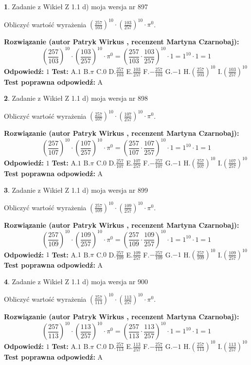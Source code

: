 \documentclass[12pt, a4paper]{article}
\theoremstyle{definition} %
\newtheorem{zad}{}
\newcommand{\zadStart}[1]{\begin{zad}#1\newline}
\newcommand{\zadStop}{\end{zad}}
\newcommand{\rozwStart}[2]{\noindent \textbf{Rozwiązanie (autor #1 , recenzent #2): }\newline}
\newcommand{\rozwStop}{\newline}
\newcommand{\odpStart}{\noindent \textbf{Odpowiedź:}\newline}
\newcommand{\odpStop}{\newline}
\newcommand{\testStart}{\noindent \textbf{Test:}\newline}
\newcommand{\testStop}{\newline}
\newcommand{\kluczStart}{\noindent \textbf{Test poprawna odpowiedź:}\newline}
\newcommand{\kluczStop}{\newline}
\begin{document}
\zadStart{Zadanie z Wikieł Z 1.1 d) moja wersja nr 897}

Obliczyć wartość wyrażenia $(\frac{257}{103})^{10} \cdot (\frac{103}{257})^{10} \cdot \pi^{0}$.
\zadStop
\rozwStart{Patryk Wirkus}{Martyna Czarnobaj}
$$(\frac{257}{103})^{10} \cdot (\frac{103}{257})^{10} \cdot \pi^{0} = (\frac{257}{103} \cdot \frac{103}{257})^{10} \cdot 1 = 1^{10} \cdot 1 = 1$$
\rozwStop
\odpStart
$1$
\odpStop
\testStart
A.$1$ B.$\pi$ C.$0$ D.$\frac{257}{103}$ E.$\frac{103}{257}$
F.$-\frac{257}{103}$ G.$-1$
H.$(\frac{257}{103})^{10}$
I.$(\frac{103}{257})^{10}$
\testStop
\kluczStart
A
\kluczStop



\zadStart{Zadanie z Wikieł Z 1.1 d) moja wersja nr 898}

Obliczyć wartość wyrażenia $(\frac{257}{107})^{10} \cdot (\frac{107}{257})^{10} \cdot \pi^{0}$.
\zadStop
\rozwStart{Patryk Wirkus}{Martyna Czarnobaj}
$$(\frac{257}{107})^{10} \cdot (\frac{107}{257})^{10} \cdot \pi^{0} = (\frac{257}{107} \cdot \frac{107}{257})^{10} \cdot 1 = 1^{10} \cdot 1 = 1$$
\rozwStop
\odpStart
$1$
\odpStop
\testStart
A.$1$ B.$\pi$ C.$0$ D.$\frac{257}{107}$ E.$\frac{107}{257}$
F.$-\frac{257}{107}$ G.$-1$
H.$(\frac{257}{107})^{10}$
I.$(\frac{107}{257})^{10}$
\testStop
\kluczStart
A
\kluczStop



\zadStart{Zadanie z Wikieł Z 1.1 d) moja wersja nr 899}

Obliczyć wartość wyrażenia $(\frac{257}{109})^{10} \cdot (\frac{109}{257})^{10} \cdot \pi^{0}$.
\zadStop
\rozwStart{Patryk Wirkus}{Martyna Czarnobaj}
$$(\frac{257}{109})^{10} \cdot (\frac{109}{257})^{10} \cdot \pi^{0} = (\frac{257}{109} \cdot \frac{109}{257})^{10} \cdot 1 = 1^{10} \cdot 1 = 1$$
\rozwStop
\odpStart
$1$
\odpStop
\testStart
A.$1$ B.$\pi$ C.$0$ D.$\frac{257}{109}$ E.$\frac{109}{257}$
F.$-\frac{257}{109}$ G.$-1$
H.$(\frac{257}{109})^{10}$
I.$(\frac{109}{257})^{10}$
\testStop
\kluczStart
A
\kluczStop



\zadStart{Zadanie z Wikieł Z 1.1 d) moja wersja nr 900}

Obliczyć wartość wyrażenia $(\frac{257}{113})^{10} \cdot (\frac{113}{257})^{10} \cdot \pi^{0}$.
\zadStop
\rozwStart{Patryk Wirkus}{Martyna Czarnobaj}
$$(\frac{257}{113})^{10} \cdot (\frac{113}{257})^{10} \cdot \pi^{0} = (\frac{257}{113} \cdot \frac{113}{257})^{10} \cdot 1 = 1^{10} \cdot 1 = 1$$
\rozwStop
\odpStart
$1$
\odpStop
\testStart
A.$1$ B.$\pi$ C.$0$ D.$\frac{257}{113}$ E.$\frac{113}{257}$
F.$-\frac{257}{113}$ G.$-1$
H.$(\frac{257}{113})^{10}$
I.$(\frac{113}{257})^{10}$
\testStop
\kluczStart
A
\kluczStop
\end{document}
